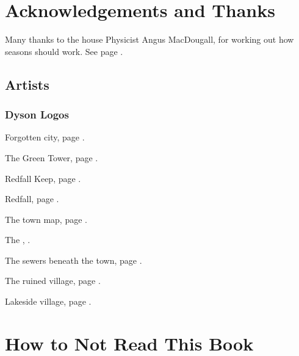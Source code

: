 
\section*{Acknowledgements and Thanks}

\begin{multicols}{2}

Many thanks to the house Physicist Angus MacDougall, for working out how seasons should work.
See page \pageref{seasons}.

\subsection*{Artists}

\subsubsection{Dyson Logos}

Forgotten city, page \pageref{lost_city_map}.

The Green Tower, page \pageref{green_tower_map}.

Redfall Keep, page \pageref{redfall_keep_map}.

Redfall, page \pageref{redfall_map}.

The town map, page \pageref{town_map}.

The , \pageref{mincing_pig_map}.

The sewers beneath the town, page \pageref{sewer_map}.

The ruined village, page \pageref{ruined_village_map}.

Lakeside village, page \pageref{lakeside}.

\end{multicols}

\section*{How to Not Read This Book}

